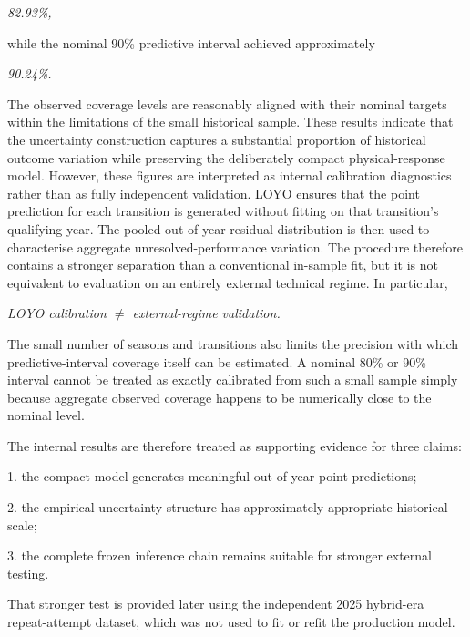 \begin{center}\textit{82.93\%,}\end{center}

while the nominal 90\% predictive interval achieved approximately

\begin{center}\textit{90.24\%.}\end{center}

The observed coverage levels are reasonably aligned with their nominal targets within the limitations of the small historical sample. These results indicate that the uncertainty construction captures a substantial proportion of historical outcome variation while preserving the deliberately compact physical-response model. However, these figures are interpreted as internal calibration diagnostics rather than as fully independent validation. LOYO ensures that the point prediction for each transition is generated without fitting on that transition's qualifying year. The pooled out-of-year residual distribution is then used to characterise aggregate unresolved-performance variation. The procedure therefore contains a stronger separation than a conventional in-sample fit, but it is not equivalent to evaluation on an entirely external technical regime. In particular,

\begin{center}\textit{LOYO calibration \ensuremath{\neq} external-regime validation.}\end{center}

The small number of seasons and transitions also limits the precision with which predictive-interval coverage itself can be estimated. A nominal 80\% or 90\% interval cannot be treated as exactly calibrated from such a small sample simply because aggregate observed coverage happens to be numerically close to the nominal level.

The internal results are therefore treated as supporting evidence for three claims:

1. the compact model generates meaningful out-of-year point predictions;

2. the empirical uncertainty structure has approximately appropriate historical scale;

3. the complete frozen inference chain remains suitable for stronger external testing.

That stronger test is provided later using the independent 2025 hybrid-era repeat-attempt dataset, which was not used to fit or refit the production model.

